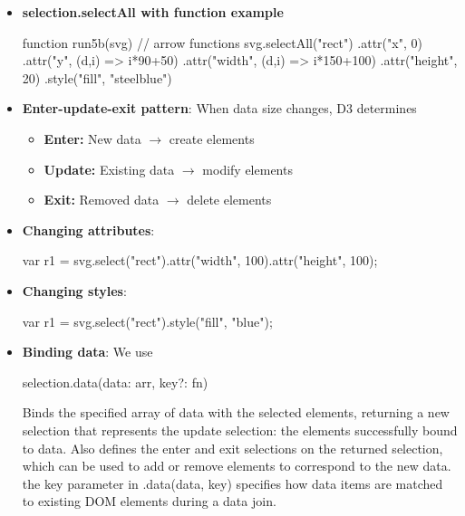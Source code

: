 \documentclass{report}
\begin{document}
\begin{itemize}
        \item \textbf{selection.selectAll with function example}
            \bigbreak \noindent 
            \begin{jscode}
                function run5b(svg) {
                    // arrow functions
                    svg.selectAll("rect")
                        .attr("x", 0)
                        .attr("y", (d,i) => i*90+50)
                        .attr("width", (d,i) => i*150+100)
                        .attr("height", 20)
                        .style("fill", "steelblue")  
                }
            \end{jscode}
        \item \textbf{Enter-update-exit pattern}: When data size changes, D3 determines
            \begin{itemize}
                \item \textbf{Enter:} New data $\to $ create elements
                \item \textbf{Update:} Existing data $\to $ modify elements
                \item \textbf{Exit:} Removed data $\to$ delete elements
            \end{itemize}
        \item \textbf{Changing attributes}: 
            \bigbreak \noindent 
            \begin{jscode}
            var r1 = svg.select("rect").attr("width", 100).attr("height", 100);
            \end{jscode}
        \item \textbf{Changing styles}: 
            \bigbreak \noindent 
            \begin{jscode}
            var r1 = svg.select("rect").style("fill", "blue"); 
            \end{jscode}
        \item \textbf{Binding data}: We use
            \bigbreak \noindent 
            \begin{jscode}
                selection.data(data: arr, key?: fn)
            \end{jscode}
            \bigbreak \noindent 
            Binds the specified array of data with the selected elements, returning a new selection that represents the update selection: the elements successfully bound to data. Also defines the enter and exit selections on the returned selection, which can be used to add or remove elements to correspond to the new data.
            \bigbreak \noindent 
            the key parameter in .data(data, key) specifies how data items are matched to existing DOM elements during a data join.

\end{itemize}
\end{document}
